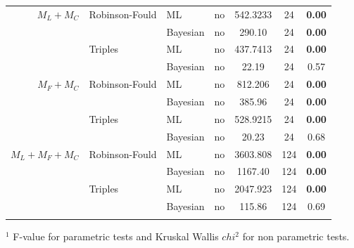 \documentclass[12pt,letterpaper]{article}
\begin{document}
\begin{table}
\begin{tabular}{rllcccc}
    $M_L+M_C$     & Robinson-Fould & ML       & no & 542.3233 & 24  & \textbf{0.00} \\ %
                  &                & Bayesian & no & 290.10   & 24  & \textbf{0.00} \\
                  & Triples        & ML       & no & 437.7413 & 24  & \textbf{0.00} \\ %
                  &                & Bayesian & no & 22.19    & 24  & 0.57          \\
    $M_F+M_C$     & Robinson-Fould & ML       & no & 812.206  & 24  & \textbf{0.00} \\ %
                  &                & Bayesian & no & 385.96   & 24  & \textbf{0.00} \\
                  & Triples        & ML       & no & 528.9215 & 24  & \textbf{0.00} \\ %
                  &                & Bayesian & no & 20.23    & 24  & 0.68          \\ 
    $M_L+M_F+M_C$ & Robinson-Fould & ML       & no & 3603.808 & 124 & \textbf{0.00} \\ %
                  &                & Bayesian & no & 1167.40  & 124 & \textbf{0.00} \\
                  & Triples        & ML       & no & 2047.923 & 124 & \textbf{0.00} \\ %
                  &                & Bayesian & no & 115.86   & 124 & 0.69          \\
    \hline
\label{Group_results}
\end{tabular}

$^1$ F-value for parametric tests and Kruskal Wallis $chi^2$ for non parametric tests.
\end{table}
\end{document}
